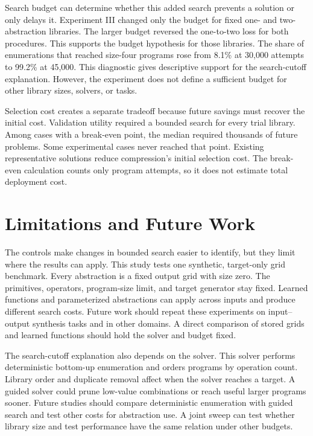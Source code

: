 \documentclass[10pt]{article}
\begin{document}
Search budget can determine whether this added search prevents a solution or
only delays it. Experiment III changed only the budget for fixed one- and
two-abstraction libraries. The larger budget reversed the one-to-two loss for
both procedures. This supports the budget hypothesis for those libraries. The
share of enumerations that reached size-four programs rose from 8.1\% at 30,000
attempts to 99.2\% at 45,000. This diagnostic gives descriptive support for the
search-cutoff explanation. However, the experiment does not define a sufficient
budget for other library sizes, solvers, or tasks.

Selection cost creates a separate tradeoff because future savings must recover
the initial cost. Validation utility required a bounded search for every trial
library. Among cases with a break-even point, the median required thousands of
future problems. Some experimental cases never reached that point.
Existing representative solutions reduce compression's initial selection cost.
The break-even calculation counts only program attempts, so it does not
estimate total deployment cost.

\section{Limitations and Future Work}

The controls make changes in bounded search easier to identify, but they limit
where the results can apply. This study tests one synthetic, target-only grid
benchmark. Every abstraction is a fixed output grid with size zero. The
primitives, operators, program-size limit, and target generator stay fixed.
Learned functions and parameterized abstractions can apply across inputs and
produce different search costs. Future work should repeat these experiments on
input--output synthesis tasks and in other domains.
A direct comparison of stored grids and learned functions should hold the
solver and budget fixed.

The search-cutoff explanation also depends on the solver. This solver performs
deterministic bottom-up enumeration and orders programs by operation count.
Library order and duplicate removal affect when the solver reaches a target. A
guided solver could prune low-value combinations or reach useful larger
programs sooner. Future studies should compare deterministic enumeration with
guided search and test other costs for abstraction use. A joint sweep can test
whether library size and test performance have the same relation under other
budgets.
\end{document}
